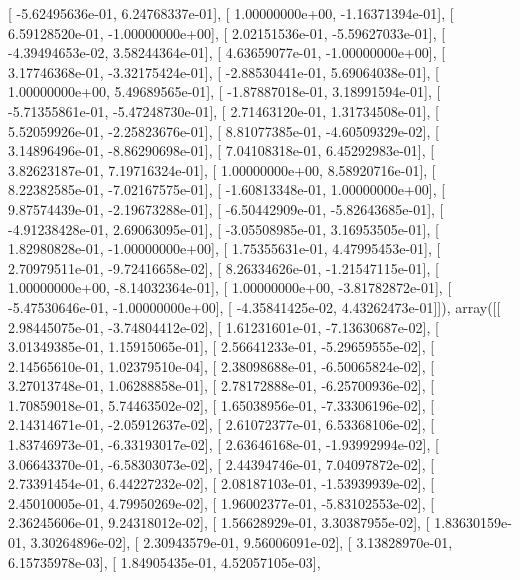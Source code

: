 \documentclass{article}
\begin{document}
       [ -5.62495636e-01,   6.24768337e-01],
       [  1.00000000e+00,  -1.16371394e-01],
       [  6.59128520e-01,  -1.00000000e+00],
       [  2.02151536e-01,  -5.59627033e-01],
       [ -4.39494653e-02,   3.58244364e-01],
       [  4.63659077e-01,  -1.00000000e+00],
       [  3.17746368e-01,  -3.32175424e-01],
       [ -2.88530441e-01,   5.69064038e-01],
       [  1.00000000e+00,   5.49689565e-01],
       [ -1.87887018e-01,   3.18991594e-01],
       [ -5.71355861e-01,  -5.47248730e-01],
       [  2.71463120e-01,   1.31734508e-01],
       [  5.52059926e-01,  -2.25823676e-01],
       [  8.81077385e-01,  -4.60509329e-02],
       [  3.14896496e-01,  -8.86290698e-01],
       [  7.04108318e-01,   6.45292983e-01],
       [  3.82623187e-01,   7.19716324e-01],
       [  1.00000000e+00,   8.58920716e-01],
       [  8.22382585e-01,  -7.02167575e-01],
       [ -1.60813348e-01,   1.00000000e+00],
       [  9.87574439e-01,  -2.19673288e-01],
       [ -6.50442909e-01,  -5.82643685e-01],
       [ -4.91238428e-01,   2.69063095e-01],
       [ -3.05508985e-01,   3.16953505e-01],
       [  1.82980828e-01,  -1.00000000e+00],
       [  1.75355631e-01,   4.47995453e-01],
       [  2.70979511e-01,  -9.72416658e-02],
       [  8.26334626e-01,  -1.21547115e-01],
       [  1.00000000e+00,  -8.14032364e-01],
       [  1.00000000e+00,  -3.81782872e-01],
       [ -5.47530646e-01,  -1.00000000e+00],
       [ -4.35841425e-02,   4.43262473e-01]]), array([[  2.98445075e-01,  -3.74804412e-02],
       [  1.61231601e-01,  -7.13630687e-02],
       [  3.01349385e-01,   1.15915065e-01],
       [  2.56641233e-01,  -5.29659555e-02],
       [  2.14565610e-01,   1.02379510e-04],
       [  2.38098688e-01,  -6.50065824e-02],
       [  3.27013748e-01,   1.06288858e-01],
       [  2.78172888e-01,  -6.25700936e-02],
       [  1.70859018e-01,   5.74463502e-02],
       [  1.65038956e-01,  -7.33306196e-02],
       [  2.14314671e-01,  -2.05912637e-02],
       [  2.61072377e-01,   6.53368106e-02],
       [  1.83746973e-01,  -6.33193017e-02],
       [  2.63646168e-01,  -1.93992994e-02],
       [  3.06643370e-01,  -6.58303073e-02],
       [  2.44394746e-01,   7.04097872e-02],
       [  2.73391454e-01,   6.44227232e-02],
       [  2.08187103e-01,  -1.53939939e-02],
       [  2.45010005e-01,   4.79950269e-02],
       [  1.96002377e-01,  -5.83102553e-02],
       [  2.36245606e-01,   9.24318012e-02],
       [  1.56628929e-01,   3.30387955e-02],
       [  1.83630159e-01,   3.30264896e-02],
       [  2.30943579e-01,   9.56006091e-02],
       [  3.13828970e-01,   6.15735978e-03],
       [  1.84905435e-01,   4.52057105e-03],
\end{document}
